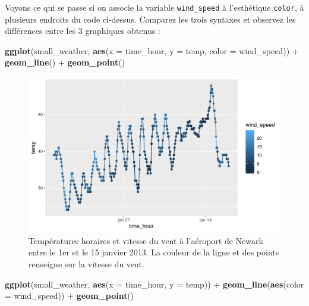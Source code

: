 \documentclass[
  a4paper,
]{article}
\newenvironment{Shaded}{\begin{snugshade}}{\end{snugshade}}
\newcommand{\DataTypeTok}[1]{\textcolor[rgb]{0.00,0.34,0.68}{#1}}
\newcommand{\KeywordTok}[1]{\textcolor[rgb]{0.12,0.11,0.11}{\textbf{#1}}}
\newcommand{\NormalTok}[1]{\textcolor[rgb]{0.12,0.11,0.11}{#1}}
\newcommand{\OperatorTok}[1]{\textcolor[rgb]{0.12,0.11,0.11}{#1}}
\newcommand{\StringTok}[1]{\textcolor[rgb]{0.75,0.01,0.01}{#1}}
\begin{document}
Voyons ce qui se passe si on associe la variable \texttt{wind\_speed} à l'esthétique \texttt{color}, à plusieurs endroits du code ci-dessus. Comparez les trois syntaxes et observez les différences entre les 3 graphiques obtenus :

\begin{Shaded}
\begin{Highlighting}[]
\KeywordTok{ggplot}\NormalTok{(small_weather, }\KeywordTok{aes}\NormalTok{(}\DataTypeTok{x =}\NormalTok{ time_hour, }\DataTypeTok{y =}\NormalTok{ temp, }\DataTypeTok{color =}\NormalTok{ wind_speed)) }\OperatorTok{+}
\StringTok{  }\KeywordTok{geom_line}\NormalTok{() }\OperatorTok{+}
\StringTok{  }\KeywordTok{geom_point}\NormalTok{()}
\end{Highlighting}
\end{Shaded}

\begin{figure}[htpb]

{\centering \includegraphics[width=0.9\linewidth]{figure/wind-1} 

}

\caption{Températures horaires et vitesse du vent à l'aéroport de Newark entre le 1er et le 15 janvier 2013. La couleur de la ligne et des points renseigne sur la vitesse du vent.}\label{fig:wind}
\end{figure}

\begin{Shaded}
\begin{Highlighting}[]
\KeywordTok{ggplot}\NormalTok{(small_weather, }\KeywordTok{aes}\NormalTok{(}\DataTypeTok{x =}\NormalTok{ time_hour, }\DataTypeTok{y =}\NormalTok{ temp)) }\OperatorTok{+}
\StringTok{  }\KeywordTok{geom_line}\NormalTok{(}\KeywordTok{aes}\NormalTok{(}\DataTypeTok{color =}\NormalTok{ wind_speed)) }\OperatorTok{+}
\StringTok{  }\KeywordTok{geom_point}\NormalTok{()}
\end{Highlighting}
\end{Shaded}
\end{document}
